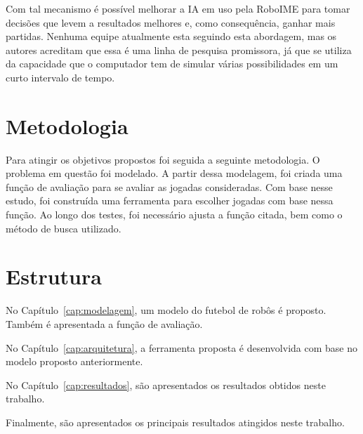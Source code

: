 Com tal mecanismo é possível melhorar a IA em uso pela RoboIME para tomar
decisões que levem a resultados melhores e, como consequência, ganhar mais
partidas.  Nenhuma equipe atualmente esta seguindo esta abordagem, mas os
autores acreditam que essa é uma linha de pesquisa promissora, já que se utiliza
da capacidade que o computador tem de simular várias possibilidades em um curto
intervalo de tempo.

\section{Metodologia}

Para atingir os objetivos propostos foi seguida a seguinte metodologia.
O problema em questão foi modelado. A partir dessa modelagem, foi
criada uma função de avaliação para se avaliar as jogadas consideradas.
Com base nesse estudo, foi construída uma ferramenta para escolher
jogadas com base nessa função. Ao longo dos testes, foi necessário
ajusta a função citada, bem como o método de busca utilizado.

\section{Estrutura}

No Capítulo~\ref{cap:modelagem}, um modelo do futebol de robôs é proposto.
Também é apresentada a função de avaliação.

No Capítulo~\ref{cap:arquitetura}, a ferramenta proposta é desenvolvida com
base no modelo proposto anteriormente.

No Capítulo~\ref{cap:resultados}, são apresentados os resultados obtidos
neste trabalho.


Finalmente, são apresentados os principais resultados atingidos neste trabalho.

